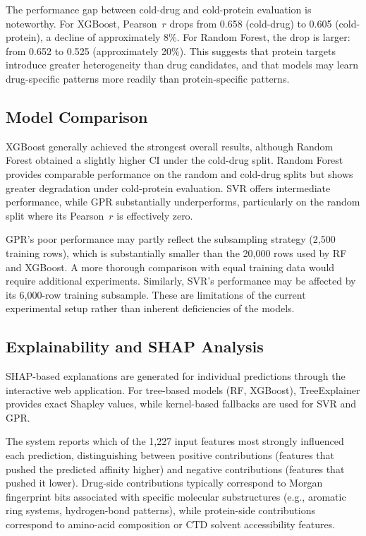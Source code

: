 \documentclass[10pt,conference]{IEEEtran}
\begin{document}
The performance gap between cold-drug and cold-protein evaluation is noteworthy. For XGBoost, Pearson~$r$ drops from 0.658 (cold-drug) to 0.605 (cold-protein), a decline of approximately 8\%. For Random Forest, the drop is larger: from 0.652 to 0.525 (approximately 20\%). This suggests that protein targets introduce greater heterogeneity than drug candidates, and that models may learn drug-specific patterns more readily than protein-specific patterns.

\subsection{Model Comparison}
\label{subsec:comparison}

XGBoost generally achieved the strongest overall results, although Random Forest obtained a slightly higher CI under the cold-drug split. Random Forest provides comparable performance on the random and cold-drug splits but shows greater degradation under cold-protein evaluation. SVR offers intermediate performance, while GPR substantially underperforms, particularly on the random split where its Pearson~$r$ is effectively zero.

GPR's poor performance may partly reflect the subsampling strategy (2,500 training rows), which is substantially smaller than the 20,000 rows used by RF and XGBoost. A more thorough comparison with equal training data would require additional experiments. Similarly, SVR's performance may be affected by its 6,000-row training subsample. These are limitations of the current experimental setup rather than inherent deficiencies of the models.

\subsection{Explainability and SHAP Analysis}
\label{subsec:shap_results}

SHAP-based explanations are generated for individual predictions through the interactive web application. For tree-based models (RF, XGBoost), TreeExplainer provides exact Shapley values, while kernel-based fallbacks are used for SVR and GPR.

The system reports which of the 1,227 input features most strongly influenced each prediction, distinguishing between positive contributions (features that pushed the predicted affinity higher) and negative contributions (features that pushed it lower). Drug-side contributions typically correspond to Morgan fingerprint bits associated with specific molecular substructures (e.g., aromatic ring systems, hydrogen-bond patterns), while protein-side contributions correspond to amino-acid composition or CTD solvent accessibility features.
\end{document}
